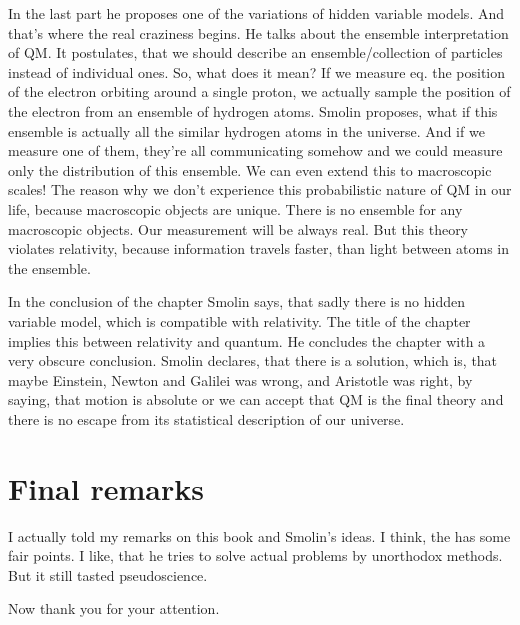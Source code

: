 In the last part he proposes one of the variations of hidden variable models. And that's where the real craziness begins. He talks about the ensemble interpretation of QM. It postulates, that we should describe an ensemble/collection of particles instead of individual ones. So, what does it mean? If we measure eq. the position of the electron orbiting around a single proton, we actually sample the position of the electron from an ensemble of hydrogen atoms. Smolin proposes, what if this ensemble is actually all the similar hydrogen atoms in the universe. And if we measure one of them, they're all communicating somehow and we could measure only the distribution of this ensemble. We can even extend this to macroscopic scales! The reason why we don't experience this probabilistic nature of QM in our life, because macroscopic objects are unique. There is no ensemble for any macroscopic objects. Our measurement will be always real. But this theory violates relativity, because information travels faster, than light between atoms in the ensemble. \par
In the conclusion of the chapter Smolin says, that sadly there is no hidden variable model, which is compatible with relativity. The title of the chapter implies this  between relativity and quantum. He concludes the chapter with a very obscure conclusion. Smolin declares, that there is a solution, which is, that maybe Einstein, Newton and Galilei was wrong, and Aristotle was right, by saying, that motion is absolute or we can accept that QM is the final theory and there is no escape from its statistical description of our universe.

\section{Final remarks}
I actually told my remarks on this book and Smolin's ideas. I think, the has some fair points. I like, that he tries to solve actual problems by unorthodox methods. But it still tasted pseudoscience. \par
Now thank you for your attention.
